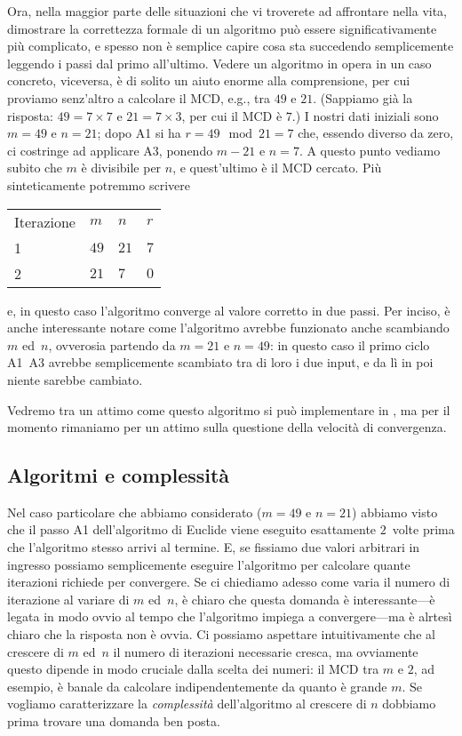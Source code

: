 Ora, nella maggior parte delle situazioni che vi troverete ad affrontare nella vita,
dimostrare la correttezza formale di un algoritmo pu\`o essere significativamente
pi\`u complicato, e spesso non \`e semplice capire cosa sta succedendo semplicemente
leggendo i passi dal primo all'ultimo. Vedere un algoritmo in opera in un caso concreto,
viceversa, \`e di solito un aiuto enorme alla comprensione, per cui proviamo
senz'altro a calcolare il MCD, e.g., tra $49$ e $21$. (Sappiamo gi\`a la risposta:
$49 = 7 \times 7$ e $21 = 7 \times 3$, per cui il MCD \`e $7$.) I nostri dati iniziali
sono $m = 49$ e $n = 21$; dopo A1 si ha $r = 49 \mod 21 = 7$ che, essendo diverso da
zero, ci costringe ad applicare A3, ponendo $m - 21$ e $n = 7$. A questo punto vediamo
subito che $m$ \`e divisibile per $n$, e quest'ultimo \`e il MCD cercato. Pi\`u
sinteticamente potremmo scrivere
\begin{center}
  \begin{tabular}{llll}
    Iterazione & $m$ & $n$ & $r$ \\
    1 & $49$ & $21$ & $7$\\
    2 & $21$ & $7$ & $0$\\
  \end{tabular}
\end{center}
e, in questo caso l'algoritmo converge al valore corretto in due passi. Per inciso,
\`e anche interessante notare come l'algoritmo avrebbe funzionato anche scambiando
$m$ ed~$n$, ovverosia partendo da $m = 21$ e $n = 49$: in questo caso il primo ciclo
A1~A3 avrebbe semplicemente scambiato tra di loro i due input, e da l\`i in poi
niente sarebbe cambiato.

Vedremo tra un attimo come questo algoritmo si pu\`o implementare in \python, ma
per il momento rimaniamo per un attimo sulla questione della velocit\`a di convergenza.


\subsection{Algoritmi e complessità}

Nel caso particolare che abbiamo considerato ($m = 49$ e $n = 21$) abbiamo visto
che il passo A1 dell'algoritmo di Euclide viene eseguito esattamente $2$~volte prima
che l'algoritmo stesso arrivi al termine. E, se fissiamo due valori arbitrari in
ingresso possiamo semplicemente eseguire l'algoritmo per calcolare quante iterazioni
richiede per convergere. Se ci chiediamo adesso come varia il numero
di iterazione al variare di $m$ ed~$n$, \`e chiaro che questa domanda \`e
interessante---\`e legata in modo ovvio al tempo che l'algoritmo impiega a
convergere---ma \`e alrtes\`i chiaro che la risposta non \`e ovvia. Ci possiamo
aspettare intuitivamente che al crescere di $m$ ed~$n$ il numero di iterazioni
necessarie cresca, ma ovviamente questo dipende in modo cruciale dalla scelta dei
numeri: il MCD tra $m$ e $2$, ad esempio, \`e banale da calcolare indipendentemente
da quanto \`e grande $m$. Se vogliamo caratterizzare la \emph{complessit\`a} dell'algoritmo
al crescere di $n$ dobbiamo prima trovare una domanda ben posta.

